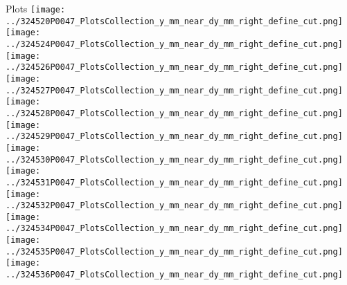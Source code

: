 \documentclass{beamer}
\begin{document}
\begin{frame}
\begin{block}{Plots}
                \texttt{[image: ../324520P0047\_PlotsCollection\_y\_mm\_near\_dy\_mm\_right\_define\_cut.png]}
                \texttt{[image: ../324524P0047\_PlotsCollection\_y\_mm\_near\_dy\_mm\_right\_define\_cut.png]}
                \texttt{[image: ../324526P0047\_PlotsCollection\_y\_mm\_near\_dy\_mm\_right\_define\_cut.png]}
                \texttt{[image: ../324527P0047\_PlotsCollection\_y\_mm\_near\_dy\_mm\_right\_define\_cut.png]}\\
                \texttt{[image: ../324528P0047\_PlotsCollection\_y\_mm\_near\_dy\_mm\_right\_define\_cut.png]}
                \texttt{[image: ../324529P0047\_PlotsCollection\_y\_mm\_near\_dy\_mm\_right\_define\_cut.png]}
                \texttt{[image: ../324530P0047\_PlotsCollection\_y\_mm\_near\_dy\_mm\_right\_define\_cut.png]}
                \texttt{[image: ../324531P0047\_PlotsCollection\_y\_mm\_near\_dy\_mm\_right\_define\_cut.png]}
                \texttt{[image: ../324532P0047\_PlotsCollection\_y\_mm\_near\_dy\_mm\_right\_define\_cut.png]}\\
                \texttt{[image: ../324534P0047\_PlotsCollection\_y\_mm\_near\_dy\_mm\_right\_define\_cut.png]}
                \texttt{[image: ../324535P0047\_PlotsCollection\_y\_mm\_near\_dy\_mm\_right\_define\_cut.png]}
                \texttt{[image: ../324536P0047\_PlotsCollection\_y\_mm\_near\_dy\_mm\_right\_define\_cut.png]}

        \end{block}
\end{frame}
\end{document}
